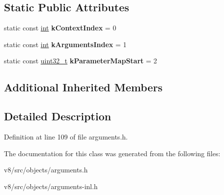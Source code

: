 \subsection*{Static Public Attributes}
\begin{DoxyCompactItemize}
\item 
\mbox{\label{classv8_1_1internal_1_1SloppyArgumentsElements_a9b195940bfa12d0f98ecc7857089f16e}} 
static const \mbox{\hyperlink{classint}{int}} {\bfseries k\+Context\+Index} = 0
\item 
\mbox{\label{classv8_1_1internal_1_1SloppyArgumentsElements_affda34b36aaf2ec881645181ee6c0856}} 
static const \mbox{\hyperlink{classint}{int}} {\bfseries k\+Arguments\+Index} = 1
\item 
\mbox{\label{classv8_1_1internal_1_1SloppyArgumentsElements_a6764635fda51b6ee2698c6c00334ea5b}} 
static const \mbox{\hyperlink{classuint32__t}{uint32\+\_\+t}} {\bfseries k\+Parameter\+Map\+Start} = 2
\end{DoxyCompactItemize}
\subsection*{Additional Inherited Members}


\subsection{Detailed Description}


Definition at line 109 of file arguments.\+h.



The documentation for this class was generated from the following files\+:\begin{DoxyCompactItemize}
\item 
v8/src/objects/arguments.\+h\item 
v8/src/objects/arguments-\/inl.\+h\end{DoxyCompactItemize}
